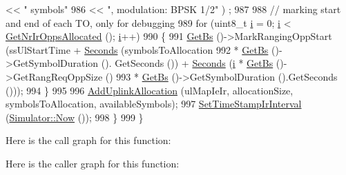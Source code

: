 \begin{DoxyCode}
       << \textcolor{stringliteral}{" symbols"}
986                                                                               << \textcolor{stringliteral}{", modulation: BPSK 1/2"} )
      ;
987 
988       \textcolor{comment}{// marking start and end of each TO, only for debugging}
989       \textcolor{keywordflow}{for} (uint8\_t \hyperlink{bernuolliDistribution_8m_a6f6ccfcf58b31cb6412107d9d5281426}{i} = 0; \hyperlink{bernuolliDistribution_8m_a6f6ccfcf58b31cb6412107d9d5281426}{i} < \hyperlink{classns3_1_1UplinkScheduler_a9a2cbb04c1e84a028fc1545e8f054b80}{GetNrIrOppsAllocated} (); \hyperlink{bernuolliDistribution_8m_a6f6ccfcf58b31cb6412107d9d5281426}{i}++)
990         \{
991           \hyperlink{classns3_1_1UplinkScheduler_afe61b7de71d92d2dff1b135744a6ff7e}{GetBs} ()->MarkRangingOppStart (ssUlStartTime + \hyperlink{group__timecivil_ga33c34b816f8ff6628e33d5c8e9713b9e}{Seconds} (symbolsToAllocation
992                                                                   * \hyperlink{classns3_1_1UplinkScheduler_afe61b7de71d92d2dff1b135744a6ff7e}{GetBs} ()->GetSymbolDuration ().
      GetSeconds ()) + \hyperlink{group__timecivil_ga33c34b816f8ff6628e33d5c8e9713b9e}{Seconds} (\hyperlink{bernuolliDistribution_8m_a6f6ccfcf58b31cb6412107d9d5281426}{i} * \hyperlink{classns3_1_1UplinkScheduler_afe61b7de71d92d2dff1b135744a6ff7e}{GetBs} ()->GetRangReqOppSize ()
993                                                                                                            
                        * \hyperlink{classns3_1_1UplinkScheduler_afe61b7de71d92d2dff1b135744a6ff7e}{GetBs} ()->GetSymbolDuration ().GetSeconds ()));
994         \}
995 
996       \hyperlink{classns3_1_1UplinkSchedulerMBQoS_a23b74ad65ec3d22b55d25648addd7486}{AddUplinkAllocation} (ulMapIeIr, allocationSize, symbolsToAllocation, 
      availableSymbols);
997       \hyperlink{classns3_1_1UplinkScheduler_ad6e89aef6cf4a9d485762f8bd08ec24e}{SetTimeStampIrInterval} (\hyperlink{classns3_1_1Simulator_ac3178fa975b419f7875e7105be122800}{Simulator::Now} ());
998     \}
999 \}
\end{DoxyCode}


Here is the call graph for this function\+:




Here is the caller graph for this function\+:


